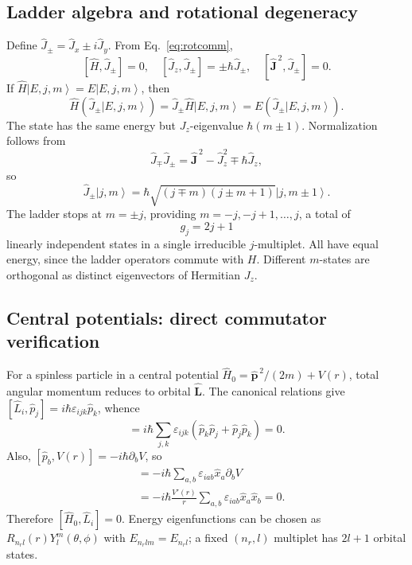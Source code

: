 \documentclass[11pt,a4paper]{article}
\theoremstyle{definition}
\newcommand{\ket}[1]{\left|#1\right\rangle}
\begin{document}
\subsection{Ladder algebra and rotational degeneracy}
Define \(\hat J_\pm=\hat J_x\pm i\hat J_y\). From Eq.~\eqref{eq:rotcomm},
\begin{equation}
\boxed{[\hat H,\hat J_\pm]=0,\quad[\hat J_z,\hat J_\pm]=\pm\hbar\hat J_\pm,
\quad[\hat{\mathbf J}^{\,2},\hat J_\pm]=0.}
\end{equation}
If \(\hat H\ket{E,j,m}=E\ket{E,j,m}\), then
\begin{equation}
\hat H(\hat J_\pm\ket{E,j,m})
=\hat J_\pm\hat H\ket{E,j,m}
=E(\hat J_\pm\ket{E,j,m}).
\end{equation}
The state has the same energy but \(J_z\)-eigenvalue \(\hbar(m\pm1)\). Normalization follows from
\begin{equation}
\hat J_\mp\hat J_\pm=\hat{\mathbf J}^{\,2}-\hat J_z^2\mp\hbar\hat J_z,
\end{equation}
so
\begin{equation}
\boxed{\hat J_\pm\ket{j,m}
=\hbar\sqrt{(j\mp m)(j\pm m+1)}\ket{j,m\pm1}.}
\label{eq:ladder}
\end{equation}
The ladder stops at \(m=\pm j\), providing \(m=-j,-j+1,\ldots,j\), a total of
\begin{equation}
\boxed{g_j=2j+1}
\label{eq:mult}
\end{equation}
linearly independent states in a single irreducible \(j\)-multiplet. All have equal energy, since the ladder operators commute with \(H\). Different \(m\)-states are orthogonal as distinct eigenvectors of Hermitian \(J_z\).
\subsection{Central potentials: direct commutator verification}
For a spinless particle in a central potential \(\hat H_0=\hat{\mathbf p}^{\,2}/(2m)+V(r)\), total angular momentum reduces to orbital \(\hat{\mathbf L}\). The canonical relations give \([\hat L_i,\hat p_j]=i\hbar\varepsilon_{ijk}\hat p_k\), whence
\begin{equation}
[\hat L_i,\hat{\mathbf p}^{\,2}]
=i\hbar\sum_{j,k}\varepsilon_{ijk}(\hat p_k\hat p_j+\hat p_j\hat p_k)=0.
\end{equation}
Also, \([\hat p_b,V(r)]=-i\hbar\partial_b V\), so
\begin{align}
[\hat L_i,V(r)]
&=-i\hbar\sum_{a,b}\varepsilon_{iab}\hat x_a\partial_bV\\
&=-i\hbar\frac{V'(r)}r\sum_{a,b}\varepsilon_{iab}\hat x_a\hat x_b=0.
\end{align}
Therefore \([\hat H_0,\hat L_i]=0\). Energy eigenfunctions can be chosen as \(R_{n_rl}(r)Y_l^m(\theta,\phi)\) with \(E_{n_rlm}=E_{n_rl}\); a fixed \((n_r,l)\) multiplet has \(2l+1\) orbital states.
\end{document}
